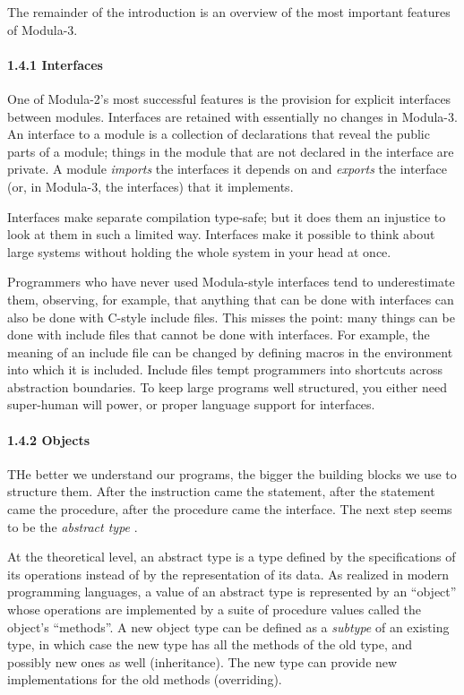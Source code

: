 \documentclass[10pt]{article}
\begin{document}
  The remainder of the introduction is an overview of the most important features of Modula-3. 


 
\paragraph{1.4.1 Interfaces}


  One of Modula-2's most successful features is the provision for explicit interfaces between modules. Interfaces are retained with essentially no changes in Modula-3. An interface to a module is a collection of declarations that reveal the public parts of a module; things in the module that are not declared in the interface are private. A module \emph{imports}
 the interfaces it depends on and \emph{exports}
 the interface (or, in Modula-3, the interfaces) that it implements. 


  Interfaces make separate compilation type-safe; but it does them an injustice to look at them in such a limited way. Interfaces make it possible to think about large systems without holding the whole system in your head at once. 


  Programmers who have never used Modula-style interfaces tend to underestimate them, observing, for example, that anything that can be done with interfaces can also be done with C-style include files. This misses the point: many things can be done with include files that cannot be done with interfaces. For example, the meaning of an include file can be changed by defining macros in the environment into which it is included. Include files tempt programmers into shortcuts across abstraction boundaries. To keep large programs well structured, you either need super-human will power, or proper language support for interfaces. 


 
\paragraph{1.4.2 Objects}


  THe better we understand our programs, the bigger the building blocks we use to structure them. After the instruction came the statement, after the statement came the procedure, after the procedure came the interface. The next step seems to be the \emph{abstract type}
. 


 At the theoretical level, an abstract type is a type defined by the specifications of its operations instead of by the representation of its data. As realized in modern programming languages, a value of an abstract type is represented by an ``object'' whose operations are implemented by a suite of procedure values called the object's ``methods''. A new object type can be defined as a \emph{subtype}
 of an existing type, in which case the new type has all the methods of the old type, and possibly new ones as well (inheritance). The new type can provide new implementations for the old methods (overriding). 
\end{document}
